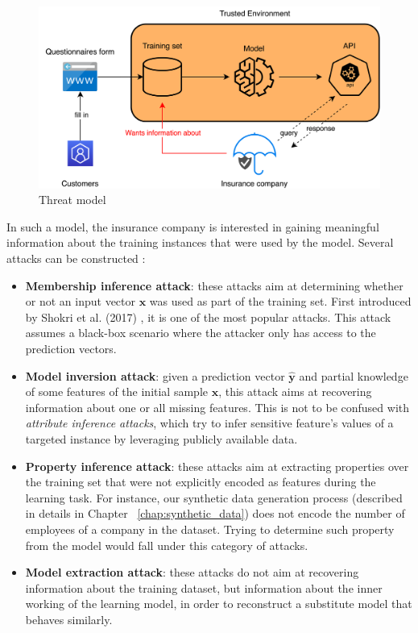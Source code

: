 \begin{figure}[h!]
	\center
	\includegraphics[scale=0.76]{images/introduction/threat_model}
	\caption{\label{fig:threat_model} Threat model}
\end{figure}

In such a model, the insurance company is interested in gaining meaningful information about the training instances that were used by the model. Several attacks can be constructed \cite{ml_survey}:

\begin{itemize}
	\item \textbf{Membership inference attack}: these attacks aim at determining whether or not an input vector $\mathbf{x}$ was used as part of the training set. First introduced by Shokri et al. (2017) \cite{shokri}, it is one of the most popular attacks. This attack assumes a black-box scenario where the attacker only has access to the prediction vectors.
	\item \textbf{Model inversion attack}: given a prediction vector $\mathbf{\hat{y}}$ and partial knowledge of some features of the initial sample $\mathbf{x}$, this attack aims at recovering information about one or all missing features. This is not to be confused with \textit{attribute inference attacks}, which try to infer sensitive feature's values of a targeted instance by leveraging publicly available data.
	\item \textbf{Property inference attack}: these attacks aim at extracting properties over the training set that were not explicitly encoded as features during the learning task. For instance, our synthetic data generation process (described in details in Chapter ~\ref{chap:synthetic_data}) does not encode the number of employees of a company in the dataset. Trying to determine such property from the model would fall under this category of attacks.
	\item \textbf{Model extraction attack}: these attacks do not aim at recovering information about the training dataset, but information about the inner working of the learning model, in order to reconstruct a substitute model that behaves similarly.
\end{itemize}

